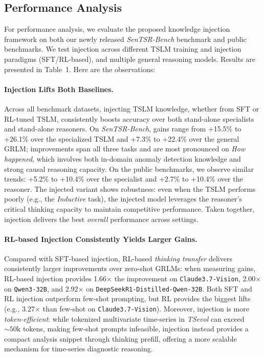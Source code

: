 \documentclass[twoside]{article}
\begin{document}
\subsection{Performance Analysis}

For performance analysis, we evaluate the proposed knowledge injection framework on both our newly released \textit{SenTSR-Bench} benchmark and  public benchmarks. We test injection across different TSLM training and injection paradigms (SFT/RL-based), and multiple general reasoning models. Results are presented in Table~1. Here are the observations:

\paragraph{Injection Lifts Both Baselines.}
Across all benchmark datasets, injecting TSLM knowledge, whether from SFT or RL-tuned TSLM, consistently boosts accuracy over both stand-alone specialists and stand-alone reasoners. On \textit{SenTSR-Bench}, gains range from {+15.5\% to +26.1\%} over the specialized TSLM and {+7.3\% to +22.4\%} over the general GRLM; improvements span all three tasks and are most pronounced on \emph{How happened}, which involves both in-domain anomaly detection knowledge and strong causal reasoning capacity. On the public benchmarks, we observe similar trends: {+5.2\% to +10.4\%} over the specialist and {+2.7\% to +10.4\%} over the reasoner. The injected variant shows robustness: even when the TSLM performs poorly (e.g., the \emph{Inductive} task), the injected model leverages the reasoner’s critical thinking capacity to maintain competitive performance. Taken together, injection delivers the best \textit{overall} performance across settings.



\paragraph{RL-based  Injection Consistently Yields Larger Gains.}
Compared with SFT-based injection, RL-based \emph{thinking transfer} delivers consistently larger improvements over zero-shot GRLMs: when measuring gains, RL-based injection provides {1.66}\(\times\) the improvement on \texttt{Claude3.7-Vision}, {2.00}\(\times\) on \texttt{Qwen3-32B}, and {2.92}\(\times\) on \texttt{DeepSeekR1-Distilled-Qwen-32B}. Both SFT and RL injection outperform few-shot prompting, but RL provides the biggest lifts (e.g., {3.27}\(\times\) than few-shot  on \texttt{Claude3.7-Vision}). Moreover, injection is more \emph{token-efficient}: while tokenized multivariate time-series in \textit{TSevol} can exceed \(\sim\!50\mathrm{k}\) tokens, making few-shot prompts infeasible, injection instead provides a compact analysis snippet through thinking prefill, offering a more scalable  mechanism for time-series diagnostic reasoning.
\end{document}
